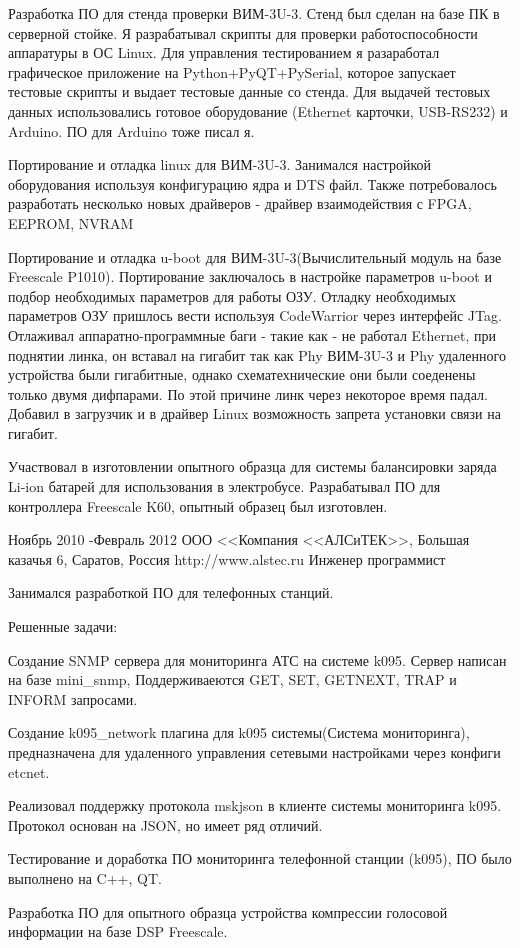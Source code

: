 {\begin{itemize-noindent}
\item{Разработка ПО для стенда проверки ВИМ-3U-3. Стенд был сделан на базе ПК в серверной стойке. Я разрабатывал скрипты для проверки работоспособности аппаратуры в ОС Linux. Для управления тестированием я разаработал графическое приложение на Python+PyQT+PySerial, которое запускает тестовые скрипты и выдает тестовые данные со стенда. Для выдачей тестовых данных использовались готовое оборудование (Ethernet карточки, USB-RS232) и Arduino. ПО для Arduino тоже писал я.}
\item{Портирование и отладка linux для ВИМ-3U-3. Занимался настройкой оборудования используя конфигурацию ядра и DTS файл. Также потребовалось разработать несколько новых драйверов - драйвер взаимодействия с FPGA, EEPROM, NVRAM }
\item{Портирование и отладка u-boot для ВИМ-3U-3(Вычислительный модуль на базе Freescale P1010). Портирование заключалось в настройке параметров u-boot и подбор необходимых параметров для работы ОЗУ. Отладку необходимых параметров ОЗУ пришлось вести используя CodeWarrior через интерфейс JTag. Отлаживал аппаратно-программные баги - такие как - не работал Ethernet, при поднятии линка, он вставал на гигабит так как Phy ВИМ-3U-3 и Phy удаленного устройства были гигабитные, однако схематехнические они были соеденены только двумя дифпарами. По этой причине линк через некоторое время падал. Добавил в загрузчик и в драйвер Linux возможность запрета установки связи на гигабит.}
\item{Участвовал в изготовлении опытного образца для системы балансировки заряда Li-ion батарей для использования в электробусе. Разрабатывал ПО для контроллера Freescale K60, опытный образец был изготовлен.}
\end{itemize-noindent}
}


\job
{Ноябрь 2010 -}{Февраль 2012}
{ООО <<Компания <<АЛСиТЕК>>, Большая казачья 6, Саратов, Россия}
{http://www.alstec.ru}
{Инженер программист}
{Занимался разработкой ПО для телефонных станций.

Решенные задачи:
\begin{itemize-noindent}
\item{Создание SNMP сервера для мониторинга АТС на системе k095. Сервер написан на базе mini\_snmp, Поддерживаеются GET, SET, GETNEXT, TRAP и INFORM запросами.}
\item{Создание k095\_network плагина для k095 системы(Система мониторинга), предназначена для удаленного управления сетевыми настройками через конфиги etcnet. }
\item{Реализовал поддержку протокола mskjson в клиенте системы мониторинга k095. Протокол основан на JSON, но имеет ряд отличий.}
\item{Тестирование и доработка ПО мониторинга телефонной станции (k095), ПО было выполнено на C++, QT.}
\item{Разработка ПО для опытного образца устройства компрессии голосовой информации на базе DSP Freescale.}
\end{itemize-noindent}
}

